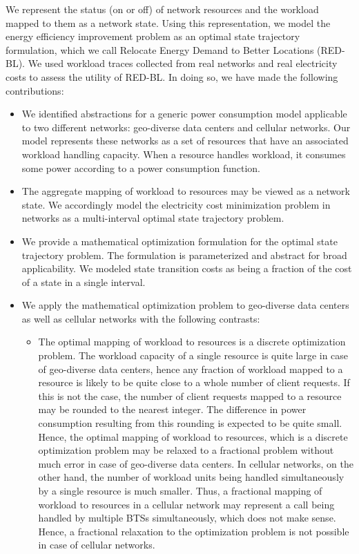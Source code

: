 We represent the status (on or off) of network resources and the workload mapped to them as a network state. Using this representation, we model the energy efficiency improvement problem as an optimal state trajectory formulation, which we call Relocate Energy Demand to Better Locations (RED-BL). We used workload traces collected from real networks and real electricity costs to assess the utility of RED-BL. In doing so, we have made the following contributions:
\begin{itemize}
\item We identified abstractions for a generic power consumption model applicable to two different networks: geo-diverse data centers and cellular networks. Our model represents these networks as a set of resources that have an associated workload handling capacity. When a resource handles workload, it consumes some power according to a power consumption function. 
\item The aggregate mapping of workload to resources may be viewed as a network state. We accordingly model the electricity cost minimization problem in networks as a multi-interval optimal state trajectory problem.
\item We provide a mathematical optimization formulation for the optimal state trajectory problem. The formulation is parameterized and abstract for broad applicability. We modeled state transition costs as being a fraction of the cost of a state in a single interval.
\item We apply the mathematical optimization problem to geo-diverse data centers as well as cellular networks with the following contrasts:
	\begin{itemize}
	\item The optimal mapping of workload to resources is a discrete optimization problem. The workload capacity of a single resource is quite large in case of geo-diverse data centers, hence any fraction of workload mapped to a resource is likely to be quite close to a whole number of client requests. If this is not the case, the number of client requests mapped to a resource may be rounded to the nearest integer. The difference in power consumption resulting from this rounding is expected to be quite small. Hence, the optimal mapping of workload to resources, which is a discrete optimization problem may be relaxed to a fractional problem without much error in case of geo-diverse data centers. In cellular networks, on the other hand, the number of workload units being handled simultaneously by a single resource is much smaller. Thus, a fractional mapping of workload to resources in a cellular network may represent a call being handled by multiple BTSs simultaneously, which does not make sense. Hence, a fractional relaxation to the optimization problem is not possible in case of cellular networks.

\end{itemize}
\end{itemize}
